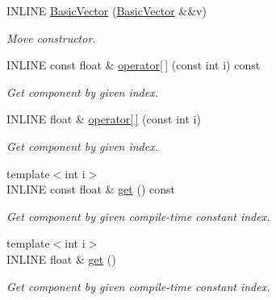 \begin{DoxyCompactItemize}
I\+N\+L\+I\+NE \hyperlink{classBasicVector_3_01float_01_4_a0266fc91fed60b9720195065fe8686ee}{Basic\+Vector} (\hyperlink{classBasicVector}{Basic\+Vector} \&\&v)
\begin{DoxyCompactList}\small\item\em Move constructor. \end{DoxyCompactList}\item 
\hypertarget{classBasicVector_3_01float_01_4_a130beba5af7e15bc9d4584abf530a1fc}{}\label{classBasicVector_3_01float_01_4_a130beba5af7e15bc9d4584abf530a1fc} 
I\+N\+L\+I\+NE const float \& \hyperlink{classBasicVector_3_01float_01_4_a130beba5af7e15bc9d4584abf530a1fc}{operator\mbox{[}$\,$\mbox{]}} (const int i) const
\begin{DoxyCompactList}\small\item\em Get component by given index. \end{DoxyCompactList}\item 
\hypertarget{classBasicVector_3_01float_01_4_a60aa0ab99c1acf3382727e250e0517c9}{}\label{classBasicVector_3_01float_01_4_a60aa0ab99c1acf3382727e250e0517c9} 
I\+N\+L\+I\+NE float \& \hyperlink{classBasicVector_3_01float_01_4_a60aa0ab99c1acf3382727e250e0517c9}{operator\mbox{[}$\,$\mbox{]}} (const int i)
\begin{DoxyCompactList}\small\item\em Get component by given index. \end{DoxyCompactList}\item 
\hypertarget{classBasicVector_3_01float_01_4_a94d72134d2640242eaeda417d012f712}{}\label{classBasicVector_3_01float_01_4_a94d72134d2640242eaeda417d012f712} 
{\footnotesize template$<$int i$>$ }\\I\+N\+L\+I\+NE const float \& \hyperlink{classBasicVector_3_01float_01_4_a94d72134d2640242eaeda417d012f712}{get} () const
\begin{DoxyCompactList}\small\item\em Get component by given compile-\/time constant index. \end{DoxyCompactList}\item 
\hypertarget{classBasicVector_3_01float_01_4_ada76384c93d58c1fc7213da82f35f5e5}{}\label{classBasicVector_3_01float_01_4_ada76384c93d58c1fc7213da82f35f5e5} 
{\footnotesize template$<$int i$>$ }\\I\+N\+L\+I\+NE float \& \hyperlink{classBasicVector_3_01float_01_4_ada76384c93d58c1fc7213da82f35f5e5}{get} ()
\begin{DoxyCompactList}\small\item\em Get component by given compile-\/time constant index. \end{DoxyCompactList}\item 

\end{DoxyCompactItemize}

